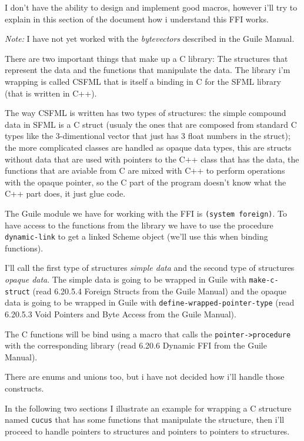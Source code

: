 \documentclass[latterpaper, leqno]{article}
\begin{document}
I don't have the ability to design and implement good macros, however i'll try to explain in this section of the document how i understand this FFI works.

\emph{Note:} I have not yet worked with the \emph{bytevectors} described in the Guile Manual.

\bigskip

There are two important things that make up a C library: The structures that represent the data and the functions that manipulate the data. The library i'm wrapping is called CSFML that is itself a binding in C for the SFML library (that is written in C++).

The way CSFML is written has two types of structures: the simple compound data in SFML is a C struct (usualy the ones that are composed from standard C types like the 3-dimentional vector that just has 3 float numbers in the struct); the more complicated classes are handled as opaque data types, this are structs without data that are used with pointers to the C++ class that has the data, the functions that are aviable from C are mixed with C++ to perform operations with the opaque pointer, so the C part of the program doesn't know what the C++ part does, it just glue code.

\bigskip

The Guile module we have for working with the FFI is \texttt{(system foreign)}. To have access to the functions from the library we have to use the procedure \texttt{dynamic-link} to get a linked Scheme object (we'll use this when binding functions).

I'll call the first type of structures \emph{simple data} and the second type of structures \emph{opaque data}. The simple data is going to be wrapped in Guile with \texttt{make-c-struct} (read 6.20.5.4 Foreign Structs from the Guile Manual) and the opaque data is going to be wrapped in Guile with \texttt{define-wrapped-pointer-type} (read 6.20.5.3 Void Pointers and Byte Access from the Guile Manual).

The C functions will be bind using a macro that calls the \texttt{pointer->procedure} with the corresponding library (read 6.20.6 Dynamic FFI from the Guile Manual).

There are enums and unions too, but i have not decided how i'll handle those constructs.

\bigskip

In the following two sections I illustrate an example for wrapping a C structure named \texttt{cucus} that has some functions that manipulate the structure, then i'll proceed to handle pointers to structures and pointers to pointers to structures.
\end{document}
